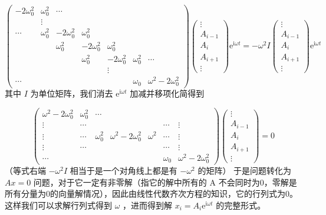 \documentclass[11pt]{book}
\begin{document}
\begin{equation}
\label{eq:5}
\begin{pmatrix}
-2\omega_0^2 & \omega^2_0 &\cdots\\
  & \vdots & \\
\cdots &  \omega_0^2 &-2 \omega_0^2 & \omega_0^2 \\
&& \omega_0^2 &-2 \omega_0^2 & \omega_0^2 \\
&&& \omega_0^2 &-2 \omega_0^2 & \omega_0^2 &\cdots\\
&&&&\vdots \\
\cdots &&&&& \omega_0 &\omega^2-2\omega^2_0
\end{pmatrix}
\begin{pmatrix}
\vdots \\A_{i-1}\\A_i\\A_{i+1}\\\vdots
\end{pmatrix}
\mathrm{e}^{\mathrm{i}\omega t}
=-\omega^2 I 
\begin{pmatrix}
\vdots\\
A_{i-1}\\
A_i\\A_{i+1}\\
\vdots
\end{pmatrix}
\mathrm{e}^{\mathrm{i}\omega t}
\end{equation}
其中 \(I\) 为单位矩阵，我们消去 \(\mathrm{e}^{\mathrm{i}\omega t}\) 加减并移项化简得到

\begin{equation}
\label{eq:6}
\begin{pmatrix}
\omega^{2}-2\omega_0^2 & \omega^2_0 &\cdots\\
\vdots & \cdots &&&& \cdots & \vdots \\
\vdots &\cdots& \omega_0^2 & \omega^2-2\omega_0^2 &  \omega^2& \cdots& \vdots\\
\vdots & \cdots &&&& \cdots & \vdots \\
\cdots &&&&& \omega_0 &\omega^2-2\omega^2_0
\end{pmatrix}
\begin{pmatrix}
\vdots \\A_{i-1}\\A_i\\A_{i+1}\\\vdots
\end{pmatrix}
=
0
\end{equation}
（等式右端 \(-\omega^2I\) 相当于是一个对角线上都是有 \(-\omega^2\) 的矩阵）
于是问题转化为 \(Ax=0\) 问题，对于它一定有非零解（指它的解中所有的 A 不会同时为0，零解是所有分量为0的向量解情况），因此由线性代数齐次方程的知识，它的行列式为0。这样我们可以求解行列式得到 \(\omega\) ，进而得到解 \(x_i=A_{i}\mathrm{e}^{\mathrm{i}\omega t}\) 的完整形式。
\end{document}
